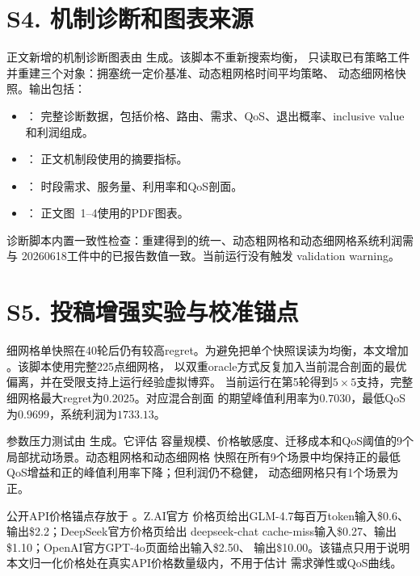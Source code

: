 \documentclass[UTF8,11pt]{ctexart}
\begin{document}
\section*{S4. 机制诊断和图表来源}

正文新增的机制诊断图表由
 生成。该脚本不重新搜索均衡，
只读取已有策略工件并重建三个对象：拥塞统一定价基准、动态粗网格时间平均策略、
动态细网格快照。输出包括：

\begin{itemize}
  \item {}：
  完整诊断数据，包括价格、路由、需求、QoS、退出概率、inclusive value 和利润组成。
  \item {}：
  正文机制段使用的摘要指标。
  \item {}：
  时段需求、服务量、利用率和QoS剖面。
  \item {}：
  正文图~1--4使用的PDF图表。
\end{itemize}

诊断脚本内置一致性检查：重建得到的统一、动态粗网格和动态细网格系统利润需与
20260618工件中的已报告数值一致。当前运行没有触发 validation warning。

\section*{S5. 投稿增强实验与校准锚点}

细网格单快照在40轮后仍有较高regret。为避免把单个快照误读为均衡，本文增加
。该脚本使用完整225点细网格，
以双重oracle方式反复加入当前混合剖面的最优偏离，并在受限支持上运行经验虚拟博弈。
当前运行在第5轮得到$5\times5$支持，完整细网格最大regret为$0.2025$。对应混合剖面
的期望峰值利用率为$0.7030$，最低QoS为$0.9699$，系统利润为$1733.13$。

参数压力测试由  生成。它评估
容量规模、价格敏感度、迁移成本和QoS阈值的9个局部扰动场景。动态粗网格和动态细网格
快照在所有9个场景中均保持正的最低QoS增益和正的峰值利用率下降；但利润仍不稳健，
动态细网格只有1个场景为正。

公开API价格锚点存放于
。Z.AI官方
价格页给出GLM-4.7每百万token输入\$0.6、输出\$2.2；DeepSeek官方价格页给出
deepseek-chat cache-miss输入\$0.27、输出\$1.10；OpenAI官方GPT-4o页面给出输入\$2.50、
输出\$10.00。该锚点只用于说明本文归一化价格处在真实API价格数量级内，不用于估计
需求弹性或QoS曲线。
\end{document}
